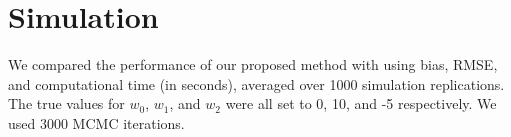 \section{Simulation}
\label{sec:simulation}

% 


We compared the performance of our proposed method with  using bias, RMSE, and computational time (in seconds), averaged over 1000 simulation replications. The true values for $ w_0 $, $ w_1 $, and $ w_2 $ were all set to 0, 10, and -5 respectively. We used 3000 MCMC iterations.

